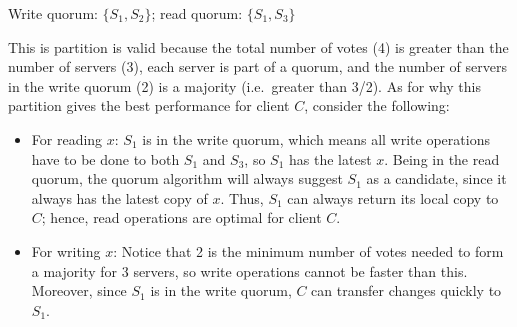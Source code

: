 Write quorum: $\{S_1, S_2\}$; read quorum: $\{S_1,S_3\}$

This is partition is valid because the total number of votes (4) is greater than the number of servers (3), each server is part of a quorum, and the number of servers in the write quorum (2) is a majority (i.e.\ greater than 3/2).
As for why this partition gives the best performance for client $C$, consider the following:
\begin{itemize}
\item
For reading $x$:
$S_1$ is in the write quorum, which means all write operations have to be done to both $S_1$ and $S_3$, so $S_1$ has the latest $x$.
Being in the read quorum, the quorum algorithm will always suggest $S_1$ as a candidate, since it always has the latest copy of $x$.
Thus, $S_1$ can always return its local copy to $C$;
hence, read operations are optimal for client $C$.
\item
For writing $x$:
Notice that 2 is the minimum number of votes needed to form a majority for 3 servers, so write operations cannot be faster than this.
Moreover, since $S_1$ is in the write quorum, $C$ can transfer changes quickly to $S_1$.
\end{itemize}
